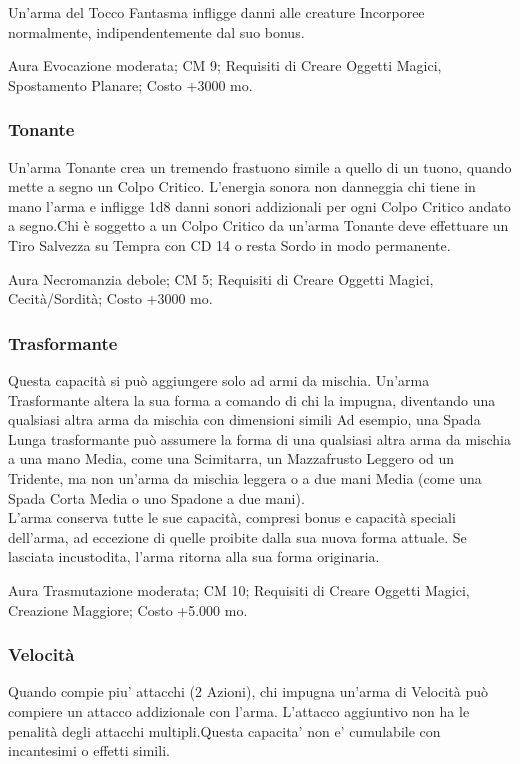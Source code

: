 \begin{multicols}{2}
Un'arma del Tocco Fantasma infligge danni alle creature Incorporee normalmente, indipendentemente dal suo bonus. 

Aura Evocazione moderata; CM 9; Requisiti di Creare Oggetti Magici, Spostamento Planare; Costo +3000 mo.

\subsubsection{Tonante}

Un'arma Tonante crea un tremendo frastuono simile a quello di un tuono, quando mette a segno un Colpo Critico. L'energia sonora non danneggia chi tiene in mano l'arma e infligge 1d8 danni sonori addizionali per ogni Colpo Critico andato a segno.Chi è soggetto a un Colpo Critico da un'arma Tonante deve effettuare un Tiro Salvezza su Tempra con CD 14 o resta Sordo in modo permanente.

Aura Necromanzia debole; CM 5; Requisiti di Creare Oggetti Magici, Cecità/Sordità; Costo +3000 mo.

\subsubsection{Trasformante}

Questa capacità si può aggiungere solo ad armi da mischia. Un'arma Trasformante altera la sua forma a comando di chi la impugna, diventando una qualsiasi altra arma da mischia con dimensioni simili Ad esempio, una Spada Lunga trasformante può assumere la forma di una qualsiasi altra arma da mischia a una mano Media, come una Scimitarra, un Mazzafrusto Leggero od un Tridente, ma non un'arma da mischia leggera o a due mani Media (come una Spada Corta Media o uno Spadone a due mani).\\
L'arma conserva tutte le sue capacità, compresi bonus e capacità speciali dell'arma, ad eccezione di quelle proibite dalla sua nuova forma attuale. Se lasciata incustodita, l'arma ritorna alla sua forma originaria.

Aura Trasmutazione moderata; CM 10; Requisiti di Creare Oggetti Magici, Creazione Maggiore; Costo +5.000 mo.

\subsubsection{Velocità}

Quando compie piu' attacchi (2 Azioni), chi impugna un'arma di Velocità può compiere un attacco addizionale con l'arma. L'attacco aggiuntivo non ha le penalità degli attacchi multipli.Questa capacita' non e' cumulabile con incantesimi o effetti simili.


\end{multicols}
